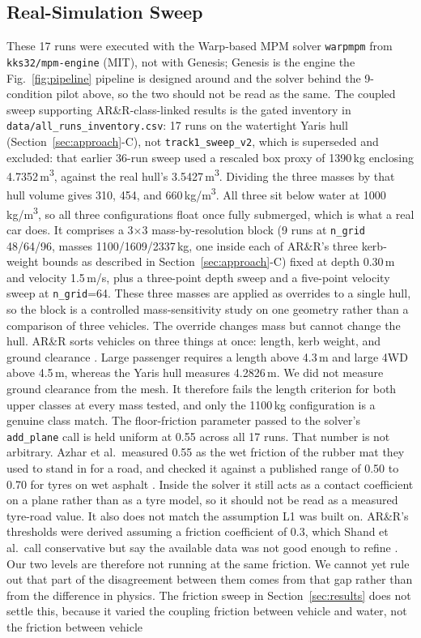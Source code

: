 \documentclass[conference]{IEEEtran}
\begin{document}
\subsection{Real-Simulation Sweep}
\label{subsec:sweep}
These 17 runs were executed with the Warp-based MPM solver \texttt{warpmpm} from \texttt{kks32/mpm-engine} (MIT), not with Genesis; Genesis is the engine the Fig.~\ref{fig:pipeline} pipeline is designed around and the solver behind the 9-condition pilot above, so the two should not be read as the same. The coupled sweep supporting AR\&R-class-linked results is the gated inventory in \texttt{data/all\_runs\_inventory.csv}: 17 runs on the watertight Yaris hull (Section~\ref{sec:approach}-C), not \texttt{track1\_sweep\_v2}, which is superseded and excluded: that earlier 36-run sweep used a rescaled box proxy of 1390\,kg enclosing 4.7352\,m\textsuperscript{3}, against the real hull's 3.5427\,m\textsuperscript{3}. Dividing the three masses by that hull volume gives 310, 454, and 660\,kg/m\textsuperscript{3}. All three sit below water at 1000\,kg/m\textsuperscript{3}, so all three configurations float once fully submerged, which is what a real car does. It comprises a 3$\times$3 mass-by-resolution block (9 runs at \texttt{n\_grid} 48/64/96, masses 1100/1609/2337\,kg, one inside each of AR\&R's three kerb-weight bounds as described in Section~\ref{sec:approach}-C) fixed at depth 0.30\,m and velocity 1.5\,m/s, plus a three-point depth sweep and a five-point velocity sweep at \texttt{n\_grid}=64. These three masses are applied as overrides to a single hull, so the block is a controlled mass-sensitivity study on one geometry rather than a comparison of three vehicles. The override changes mass but cannot change the hull. AR\&R sorts vehicles on three things at once: length, kerb weight, and ground clearance \cite{shand2011arr}. Large passenger requires a length above 4.3\,m and large 4WD above 4.5\,m, whereas the Yaris hull measures 4.2826\,m. We did not measure ground clearance from the mesh. It therefore fails the length criterion for both upper classes at every mass tested, and only the 1100\,kg configuration is a genuine class match. The floor-friction parameter passed to the solver's \texttt{add\_plane} call is held uniform at 0.55 across all 17 runs. That number is not arbitrary. Azhar et al.\ measured 0.55 as the wet friction of the rubber mat they used to stand in for a road, and checked it against a published range of 0.50 to 0.70 for tyres on wet asphalt \cite{azhar2023}. Inside the solver it still acts as a contact coefficient on a plane rather than as a tyre model, so it should not be read as a measured tyre-road value. It also does not match the assumption L1 was built on. AR\&R's thresholds were derived assuming a friction coefficient of 0.3, which Shand et al.\ call conservative but say the available data was not good enough to refine \cite{shand2011arr}. Our two levels are therefore not running at the same friction. We cannot yet rule out that part of the disagreement between them comes from that gap rather than from the difference in physics. The friction sweep in Section~\ref{sec:results} does not settle this, because it varied the coupling friction between vehicle and water, not the friction between vehicle 
\end{document}
